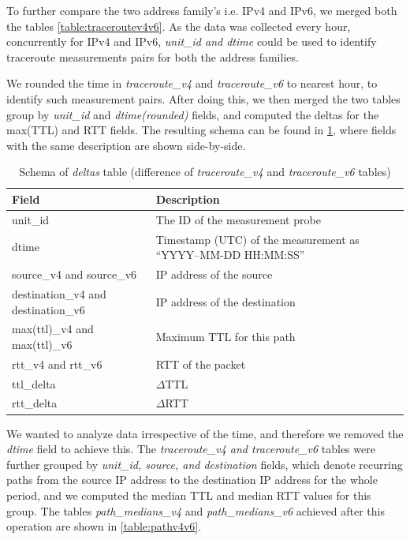 \FloatBarrier

To further compare the two address family's i.e. IPv4 and IPv6, we merged both the tables \cref{table:traceroutev4v6}. As the data was collected every hour, concurrently for IPv4 and IPv6, \textit{unit\_id and dtime} could be used to identify traceroute measurements pairs for both the address families. 

We rounded the time in \textit{traceroute\_v4} and \textit{traceroute\_v6} to nearest hour, to identify such measurement pairs. After doing this, we then merged the two tables group by \textit{unit\_id} and \textit{dtime(rounded)} fields, and computed the deltas for the max(TTL) and RTT fields. The resulting schema can be found in \cref{table:deltas}, where fields with the same description are shown side-by-side.

\begin{table}[!h]
	\centering
	\caption{Schema of \textit{deltas} table (difference of \textit{traceroute\_v4} and \textit{traceroute\_v6} tables)}
	\label{table:deltas}
	\begin{tabular}{lp{8cm}}
  		\toprule
  		\textbf{Field} & \textbf{Description} \\ 
  		\midrule
  		unit\_id & The ID of the measurement probe \\ 
  		dtime & Timestamp (UTC) of the measurement as “YYYY–MM-DD HH:MM:SS” \\  
		source\_v4 and source\_v6 &  IP address of the source \\ 
		destination\_v4 and destination\_v6 & IP address of the destination \\   
		max(ttl)\_v4 and max(ttl)\_v6 & Maximum TTL for this path \\ 
		rtt\_v4 and rtt\_v6 & RTT of the packet \\
		ttl\_delta & $\Delta$TTL \\
		rtt\_delta & $\Delta$RTT \\
  		\bottomrule
\end{tabular}
\end{table}

\FloatBarrier

We wanted to analyze data irrespective of the time, and therefore we removed the \textit{dtime} field to achieve this. The \textit{traceroute\_v4 and traceroute\_v6} tables were further grouped by \textit{unit\_id, source, and destination} fields, which denote recurring paths from the source IP address to the destination IP address for the whole period, and we computed the median TTL and median RTT values for this group. The tables \textit{path\_medians\_v4} and \textit{path\_medians\_v6} achieved after this operation are shown in \cref{table:pathv4v6}. 

